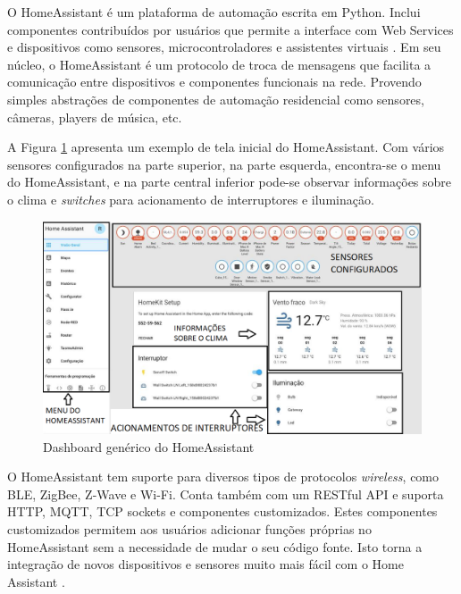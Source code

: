 O HomeAssistant é um plataforma de automação escrita em Python. Inclui componentes contribuídos por usuários que permite a interface com Web Services e dispositivos como sensores, microcontroladores e assistentes virtuais \cite{Lundrigan2017}. Em seu núcleo, o HomeAssistant é um protocolo de troca de mensagens que facilita a comunicação entre dispositivos e componentes funcionais na rede. Provendo simples abstrações de componentes de automação residencial como sensores, câmeras, players de música, etc.

A Figura \ref{fig:homeassistant-dash} apresenta um exemplo de tela inicial do HomeAssistant. Com vários sensores configurados na parte superior, na parte esquerda, encontra-se o menu do HomeAssistant, e na parte central inferior pode-se observar informações sobre o clima e \textit{switches} para acionamento de interruptores e iluminação.

\begin{figure}[htbp]
	\centering
	\includegraphics[width=1\linewidth]{figuras/homeassistant-dash.png}
	\caption{Dashboard genérico do HomeAssistant}
	\label{fig:homeassistant-dash}
\end{figure}

O HomeAssistant tem suporte para diversos tipos de protocolos \textit{wireless}, como BLE, ZigBee, Z-Wave e Wi-Fi. Conta também com um RESTful API e suporta HTTP, MQTT, TCP sockets e componentes customizados. Estes componentes customizados permitem aos usuários adicionar funções próprias no HomeAssistant sem a necessidade de mudar o seu código fonte. Isto torna a integração de novos dispositivos e sensores muito mais fácil com o Home Assistant \cite{Gomes2018}.



